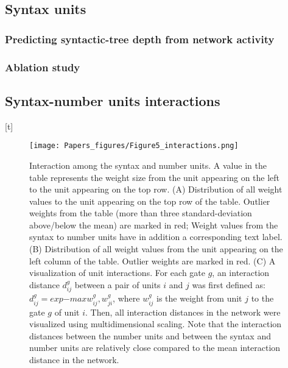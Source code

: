 \subsection{Syntax units}
\lipsum[1]

\subsubsection{Predicting syntactic-tree depth from network activity}
\lipsum[1]

\subsubsection{Ablation study}
\lipsum[1]

\subsection{Syntax-number units interactions}[t]
\lipsum[1]

\begin{figure*}
\centering
\texttt{[image: Papers\_figures/Figure5\_interactions.png]}
\caption{Interaction among the syntax and number units. A value in the table represents the weight size from the unit appearing on the left to the unit appearing on the top row. (A) Distribution of all weight values to the unit appearing on the top row of the table. Outlier weights from the table (more than three standard-deviation above/below the mean) are marked in red; Weight values from the syntax to number units have in addition a corresponding text label. (B) Distribution of all weight values from the unit appearing on the left column of the table. Outlier weights are marked in red. (C)  A visualization of unit interactions. For each gate $g$, an interaction distance $d_{ij}^g$ between a pair of units $i$ and $j$ was first defined as: $d_{ij}^g=exp{-max{w_{ij}^g, w_{ji}^g}}$, where $w_{ij}^g$ is the weight from unit $j$ to the gate $g$ of unit $i$. Then, all interaction distances in the network were visualized using multidimensional scaling. Note that the interaction distances between the number units and between the syntax and number units are relatively close compared to the mean interaction distance in the network.}
\end{figure*}
